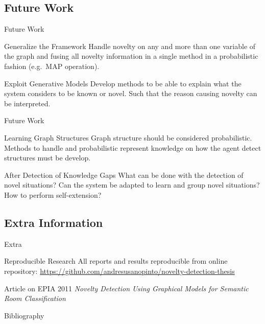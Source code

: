 \documentclass[compress]{beamer}
\begin{document}
\subsection{Future Work}
\begin{frame}{Future Work}
  \begin{block}{Generalize the Framework}
  Handle novelty on any and more than one variable of the graph and fusing
  all novelty information in a single method in a probabilistic fashion (e.g.\ MAP operation).
  \end{block}
  \begin{block}{Exploit Generative Models}
  Develop methods to be able to explain what the system considers to be known or novel.
  Such that the reason causing novelty can be interpreted.
  \end{block}
\end{frame}
\begin{frame}{Future Work}
  \begin{block}{Learning Graph Structures}
  Graph structure should be considered probabilistic. Methods to handle and probabilistic
  represent knowledge on how the agent detect structures must be develop.
  \end{block}
  \begin{block}{After Detection of Knowledge Gaps}
  What can be done with the detection of novel situations? Can the system be adapted
  to learn and group novel situations? How to perform self-extension?
  \end{block}
\end{frame}

\subsection{Extra Information}
\begin{frame}{Extra}
\begin{block}{Reproducible Research}
All reports and results reproducible from online repository:
\url{https://github.com/andresusanopinto/novelty-detection-thesis}
\end{block}

\begin{block}{Article on EPIA 2011}
\textit{Novelty Detection Using Graphical Models for Semantic Room Classification}
\end{block}
\end{frame}

\appendix
\begin{frame}[allowframebreaks]{Bibliography}


\end{frame}

\begin{frame}
 \titlepage
\end{frame}
\end{document}

